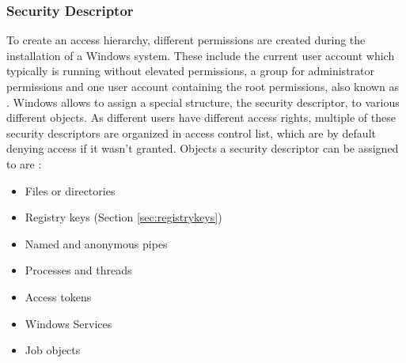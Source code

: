 \subsubsection{Security Descriptor}
\label{sec:sd}
To create an access hierarchy, different permissions are created during the installation of a Windows system. These include the current user account which typically is running without elevated permissions, a group for administrator permissions and one user account containing the root permissions, also known as  \cite{msdn_localsystem1} \cite{msdn_localsystem2}. Windows allows to assign a special structure, the security descriptor, to various different objects. As different users have different access rights, multiple of these security descriptors are organized in access control list, which are by default denying access if it wasn't granted. Objects a security descriptor can be assigned to are \cite{msdn_sd}:
\begin{itemize}
\item Files or directories
\item Registry keys (Section \ref{sec:registrykeys})
\item Named and anonymous pipes
\item Processes and threads
\item Access tokens
\item Windows Services
\item Job objects
\end{itemize}